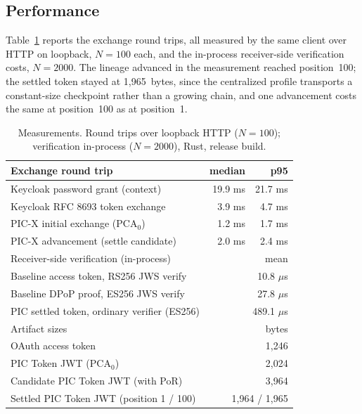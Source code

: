 \documentclass[conference]{IEEEtran}
\begin{document}
\subsection{Performance}

Table~\ref{tab:perf} reports the exchange round trips, all measured by the same client over HTTP on loopback, $N{=}100$ each, and the in-process receiver-side verification costs, $N{=}2000$. The lineage advanced in the measurement reached position~100; the settled token stayed at 1{,}965~bytes, since the centralized profile transports a constant-size checkpoint rather than a growing chain, and one advancement costs the same at position~100 as at position~1.

\begin{table}[!tp]
\centering
\caption{Measurements. Round trips over loopback HTTP ($N{=}100$); verification in-process ($N{=}2000$), Rust, release build.}
\label{tab:perf}
\small
\begin{tabular}{@{}lrr@{}}
\toprule
Exchange round trip & median & p95 \\
\midrule
Keycloak password grant (context) & 19.9 ms & 21.7 ms \\
Keycloak RFC 8693 token exchange & 3.9 ms & 4.7 ms \\
PIC-X initial exchange ($\mathrm{PCA}_0$) & 1.2 ms & 1.7 ms \\
PIC-X advancement (settle candidate) & 2.0 ms & 2.4 ms \\
\midrule
Receiver-side verification (in-process) & \multicolumn{2}{r}{mean} \\
\midrule
Baseline access token, RS256 JWS verify & \multicolumn{2}{r}{10.8 $\mu$s} \\
Baseline DPoP proof, ES256 JWS verify & \multicolumn{2}{r}{27.8 $\mu$s} \\
PIC settled token, ordinary verifier (ES256) & \multicolumn{2}{r}{489.1 $\mu$s} \\
\midrule
Artifact sizes & \multicolumn{2}{r}{bytes} \\
\midrule
OAuth access token & \multicolumn{2}{r}{1{,}246} \\
PIC Token JWT ($\mathrm{PCA}_0$) & \multicolumn{2}{r}{2{,}024} \\
Candidate PIC Token JWT (with PoR) & \multicolumn{2}{r}{3{,}964} \\
Settled PIC Token JWT (position 1 / 100) & \multicolumn{2}{r}{1{,}964 / 1{,}965} \\
\bottomrule
\end{tabular}
\end{table}
\end{document}
